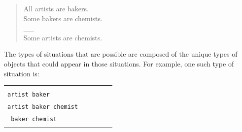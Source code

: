 \documentclass[floatsintext, doc]{apa6}
\begin{document}
\begin{quote}
All artists are bakers. \\
Some bakers are chemists. \\
\_\_ \\
Some artists are chemists.
\end{quote}

The types of situations that are possible are composed of the unique types of objects that could appear in those situations. 
For example, one such type of situation is:


\begin{tabularx}{.8\textwidth}{XXXXX}
& \\
\tt artist baker \\
\tt artist baker chemist \\
\tt \hspace{1.23cm} baker chemist 
& \\
& \\
\end{tabularx}
\end{document}
